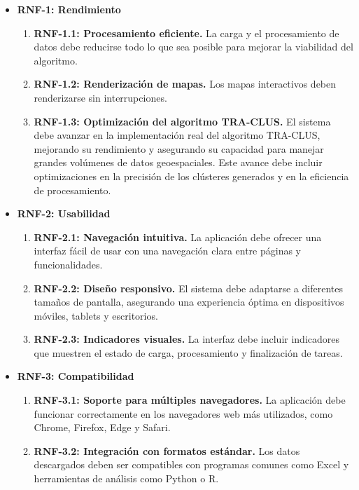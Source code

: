 \begin{itemize}

    \item \textbf{RNF-1: Rendimiento}
    \begin{enumerate}
        \item \textbf{RNF-1.1: Procesamiento eficiente.}  
        La carga y el procesamiento de datos debe reducirse todo lo que sea posible para mejorar la viabilidad del algoritmo.
        \item \textbf{RNF-1.2: Renderización de mapas.}  
        Los mapas interactivos deben renderizarse sin interrupciones.
        \item \textbf{RNF-1.3: Optimización del algoritmo TRA-CLUS.}  
        El sistema debe avanzar en la implementación real del algoritmo TRA-CLUS, mejorando su rendimiento y asegurando su capacidad para manejar grandes volúmenes de datos geoespaciales. Este avance debe incluir optimizaciones en la precisión de los clústeres generados y en la eficiencia de procesamiento.
    \end{enumerate}
        
    \item \textbf{RNF-2: Usabilidad}
    \begin{enumerate}
        \item \textbf{RNF-2.1: Navegación intuitiva.}  
        La aplicación debe ofrecer una interfaz fácil de usar con una navegación clara entre páginas y funcionalidades.
        \item \textbf{RNF-2.2: Diseño responsivo.}  
        El sistema debe adaptarse a diferentes tamaños de pantalla, asegurando una experiencia óptima en dispositivos móviles, tablets y escritorios.
        \item \textbf{RNF-2.3: Indicadores visuales.}  
        La interfaz debe incluir indicadores que muestren el estado de carga, procesamiento y finalización de tareas.
    \end{enumerate}

    \item \textbf{RNF-3: Compatibilidad}
    \begin{enumerate}
        \item \textbf{RNF-3.1: Soporte para múltiples navegadores.}  
        La aplicación debe funcionar correctamente en los navegadores web más utilizados, como Chrome, Firefox, Edge y Safari.
        \item \textbf{RNF-3.2: Integración con formatos estándar.}  
        Los datos descargados deben ser compatibles con programas comunes como Excel y herramientas de análisis como Python o R.
    \end{enumerate}


\end{itemize}
